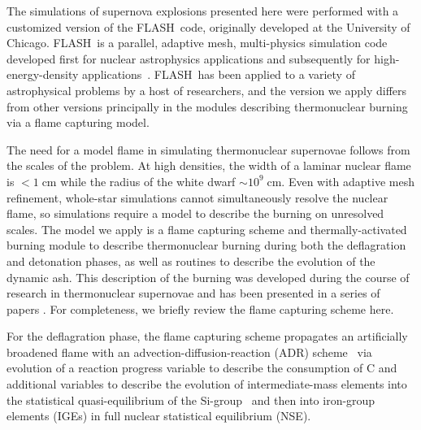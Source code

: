 \documentclass[preprint2]{aastex63}
\newcommand{\code}[1]{\textsc{#1}}
\newcommand{\FLASH}{\code{FLASH}}
\begin{document}
The simulations of supernova explosions presented here were performed
with a customized version of the \FLASH\ code, originally developed
at the University of Chicago.
\FLASH\ is a parallel, adaptive mesh, multi-physics simulation code
developed first for nuclear astrophysics applications and subsequently
for high-energy-density applications~\citep{Fryxetal00,calder.curtis.ea:high-performance,
calder.fryxell.ea:on,flash_pragmatic,flash_evolution}.
\FLASH\ has been applied to a variety of astrophysical problems by a host
of researchers, and the version we apply differs from other versions
principally in the modules describing thermonuclear burning via a
flame capturing model.

The need for a model flame in simulating thermonuclear supernovae follows
from the scales of the problem. At high densities, the width of a laminar
nuclear flame is $< 1\ensuremath{\;}{\ensuremath{\mathrm{cm}}}$ while the
radius of the white dwarf $\sim 10^9\ensuremath{\;}{\ensuremath{\mathrm{cm}}}$.
Even with adaptive mesh refinement, whole-star simulations cannot
simultaneously resolve the nuclear flame, so simulations require a model to
describe the burning on unresolved scales.  The model we apply is a flame
capturing scheme and thermally-activated burning module to describe
thermonuclear burning during both the deflagration and detonation phases,
as well as routines to describe the evolution of the dynamic ash.
This description of the burning was developed during the course of research in
thermonuclear supernovae and has been presented in a series of
papers \citep[See][and references therein]{chandlery}. For completeness,
we briefly review the flame capturing scheme here.

For the deflagration phase, the flame capturing scheme propagates an
artificially broadened flame with an advection-diffusion-reaction (ADR)
scheme~\citep{Khok95,VladWeirRyzh06} via evolution of
a reaction progress variable to describe the consumption of C
and additional variables to describe the evolution of intermediate-mass
elements into the statistical quasi-equilibrium of the
Si-group~\citep{ifk1981,khok1981,khok1983} and then into iron-group elements
(IGEs) in full nuclear statistical equilibrium (NSE).
\end{document}
